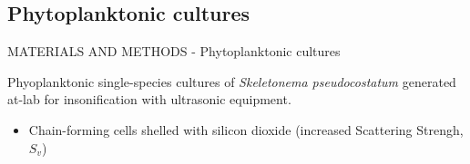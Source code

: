 \documentclass[handout]{beamer}
\newcommand\Fontable{\fontsize{9}{10}\selectfont}
\begin{document}
\subsection{Phytoplanktonic cultures}

\begin{frame}{MATERIALS AND METHODS - Phytoplanktonic cultures}
\Fontable

Phyoplanktonic single-species cultures of \textit{Skeletonema pseudocostatum} generated at-lab for insonification with ultrasonic equipment.

\begin{minipage}[c]{1\linewidth}
\begin{minipage}[c]{0.7\linewidth}
\begin{itemize}
	\Fontable
	\item<3-> Chain-forming cells shelled with silicon dioxide (increased Scattering Strengh, $S_v$)
\end{itemize}
\end{minipage}
\begin{minipage}[c]{0.29\linewidth}
\end{minipage}
\end{minipage}


\end{frame}
\end{document}
